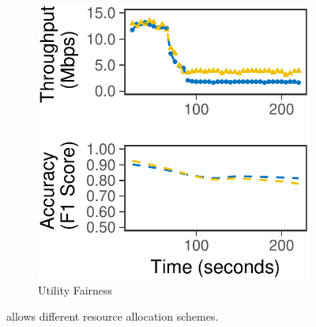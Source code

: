 \begin{figure}
\begin{subfigure}[t]{0.45\columnwidth}
    \includegraphics[width=\textwidth]{figures/multitask-right.pdf}
    \caption{Utility Fairness}
    \label{fig:eq-acc}
  \end{subfigure}
  \caption{\sysname{} allows different resource allocation schemes.}
  \label{fig:multitask}
  \vspace{-0.8em}
\end{figure}


